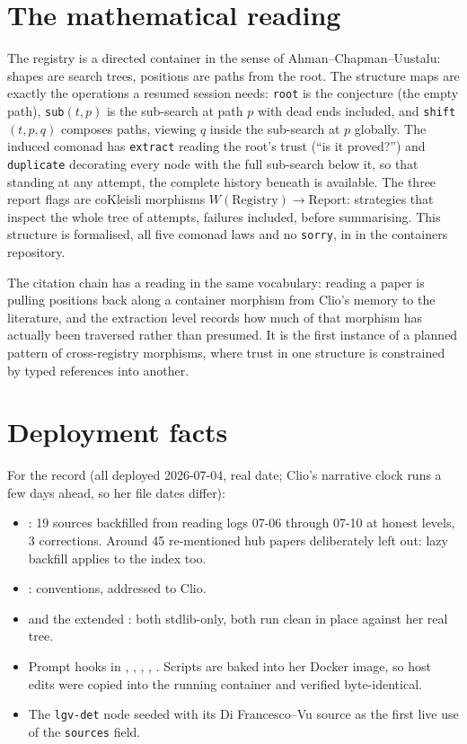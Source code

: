 \documentclass[11pt,a4paper]{article}
\begin{document}
\section{The mathematical reading}

The registry is a directed container in the sense of Ahman--Chapman--Uustalu:
shapes are search trees, positions are paths from the root. The structure
maps are exactly the operations a resumed session needs: \texttt{root} is
the conjecture (the empty path), \texttt{sub}$(t,p)$ is the sub-search at
path $p$ with dead ends included, and \texttt{shift}$(t,p,q)$ composes
paths, viewing $q$ inside the sub-search at $p$ globally. The induced
comonad has \texttt{extract} reading the root's trust (``is it proved?'')
and \texttt{duplicate} decorating every node with the full sub-search below
it, so that standing at any attempt, the complete history beneath is
available. The three report flags are coKleisli morphisms
$W(\mathrm{Registry}) \to \mathrm{Report}$: strategies that inspect the
whole tree of attempts, failures included, before summarising. This
structure is formalised, all five comonad laws and no \texttt{sorry}, in
 in the containers repository.

The citation chain has a reading in the same vocabulary: reading a paper is
pulling positions back along a container morphism from Clio's memory to the
literature, and the extraction level records how much of that morphism has
actually been traversed rather than presumed. It is the first instance of a
planned pattern of cross-registry morphisms, where trust in one structure is
constrained by typed references into another.

\section{Deployment facts}

For the record (all deployed 2026-07-04, real date; Clio's narrative clock
runs a few days ahead, so her file dates differ):

\begin{itemize}[nosep]
  \item {}: 19 sources backfilled from
    reading logs 07-06 through 07-10 at honest levels, 3 corrections. Around
    45 re-mentioned hub papers deliberately left out: lazy backfill applies
    to the index too.
  \item {}: conventions, addressed to
    Clio.
  \item {} and the extended
    : both stdlib-only, both run clean in
    place against her real tree.
  \item Prompt hooks in , ,
    , , . Scripts
    are baked into her Docker image, so host edits were copied into the
    running container and verified byte-identical.
  \item The \texttt{lgv-det} node seeded with its Di Francesco--Vu source as
    the first live use of the \texttt{sources} field.
\end{itemize}
\end{document}
